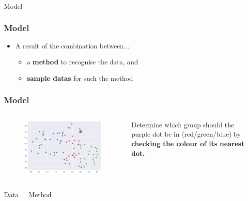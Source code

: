 \documentclass[]{beamer}
\begin{document}
\begin{frame}
\begin{center}
\Huge Model
\end{center}
\end{frame}

\begin{frame}
\frametitle{Model}
\begin{itemize}
\item<2-> A result of the combination between...
\begin{itemize}
\item<3-> a \textbf{method} to recognise the data, and
\item<4-> \textbf{sample datas} for such the method
\end{itemize}
\end{itemize}
\end{frame}

\begin{frame}
\frametitle{Model}
\begin{columns}
\begin{figure}
\includegraphics[scale=.3]{imgs/simple_knn.png}
\end{figure}
Determine which group should the purple dot be in (red/green/blue) by \textbf{checking the colour of its nearest dot.}
\end{columns}
\begin{columns}
\begin{center}
\Large Data
\end{center}
\begin{center}
\Large Method
\end{center}
\end{columns}
\end{frame}
\end{document}

